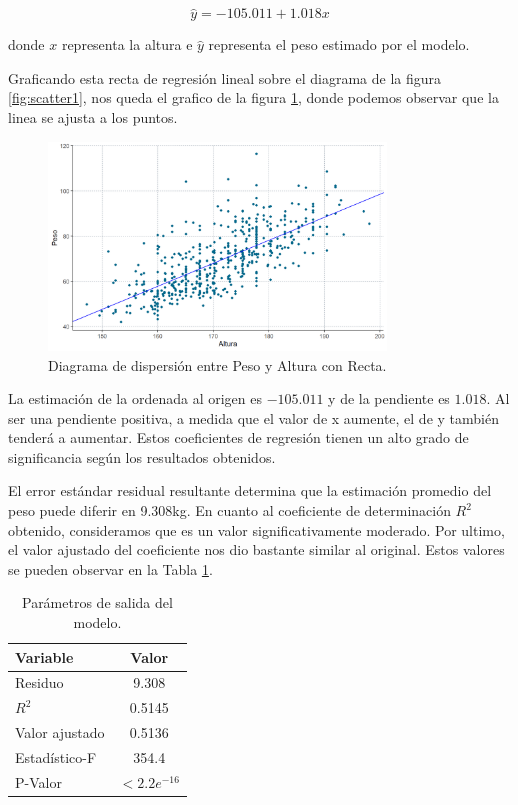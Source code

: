 \documentclass{article} %
\begin{document}
\begin{equation}
\hat{y} = -105.011 + 1.018x
\end{equation}

 donde $x$ representa la altura e $\hat{y}$ representa el peso estimado por el modelo.
 
Graficando esta recta de regresión lineal sobre el diagrama de la figura \ref{fig:scatter1}, nos queda el grafico de la figura \ref{fig:scatter2}, donde podemos observar que la linea se ajusta a los puntos.

\begin{figure}[H]
	\centering
	\includegraphics[width=0.8\textwidth]{images/1-2 Scatter Recta}
	\caption{Diagrama de dispersión entre Peso y Altura con Recta.}
	\label{fig:scatter2}
\end{figure}

La estimación de la ordenada al origen es $-105.011$ y de la pendiente es $1.018$. Al ser una pendiente positiva, a medida que el valor de x aumente, el de y también tenderá a aumentar. Estos coeficientes de regresión tienen un alto grado de significancia según los resultados obtenidos.

El error estándar residual resultante determina que la estimación promedio del peso puede diferir en 9.308kg. En cuanto al coeficiente de determinación $R^2$ obtenido, consideramos que es un valor significativamente moderado. Por ultimo, el valor ajustado del coeficiente nos dio bastante similar al original. Estos valores se pueden observar en la Tabla \ref{tab:table-punto-1-2-c}.

\begin{table}[H]
	\centering
		\begin{tabular}{||l | c ||}
			\hline
			\hline
			Variable & 	Valor\\
			\hline			
			\hline
			Residuo & 9.308\\
			\hline
			$R^2$ & 0.5145\\
			\hline
			Valor ajustado & 0.5136 \\
			\hline
			Estadístico-F & 354.4 \\
			\hline
			P-Valor & $<2.2e^{-16}$ \\
			\hline
			\hline
		\end{tabular}
		\caption{Parámetros de salida del modelo.}
	\label{tab:table-punto-1-2-c}
\end{table}
\end{document}
